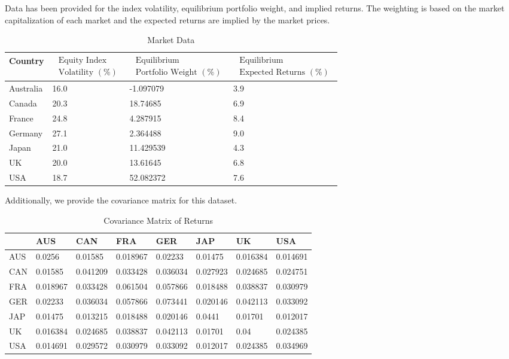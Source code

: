 \documentclass[13pt]{article}
\theoremstyle{definition}
\theoremstyle{remark}
\begin{document}
Data has been provided for the index volatility, equilibrium portfolio weight, and implied returns. The weighting is based on the market capitalization of each market and the expected returns are implied by the market prices. 

\begin{table}[!htp]
\centering
    \caption{Market Data}
    \label{tab:market data}
\begin{tabular}{|l|l|l|l|}
\hline Country & $\begin{array}{l}\text { Equity Index}\\ \text{ Volatility }
(\%)\end{array}$ & $\begin{array}{l}\text { Equilibrium}\\ \text{ Portfolio Weight }(\%)\end{array}$ & $\begin{array}{l}\text { Equilibrium} \\
\text { Expected  Returns }(\%)\end{array}$ \\
\hline Australia & 16.0 & -1.097079 & 3.9 \\
\hline Canada & 20.3 & 18.74685 & 6.9 \\
\hline France & 24.8 & 4.287915 & 8.4 \\
\hline Germany & 27.1 & 2.364488 & 9.0 \\
\hline Japan & 21.0 & 11.429539 & 4.3 \\
\hline UK & 20.0 & 13.61645 & 6.8 \\
\hline USA & 18.7 & 52.082372 & 7.6 \\
\hline
\end{tabular}
\end{table}
Additionally, we provide the covariance matrix for this dataset.
\begin{table}[!htp]
\centering
    \caption{Covariance Matrix of Returns}
    \label{tab:covariance matrix}
\begin{tabular}{|l|l|l|l|l|l|l|l|}
\hline & AUS & CAN & FRA & GER & JAP & UK & USA \\
\hline AUS & 0.0256 & 0.01585 & 0.018967 & 0.02233 & 0.01475 & 0.016384 & 0.014691 \\
\hline CAN & 0.01585 & 0.041209 & 0.033428 & 0.036034 & 0.027923 & 0.024685 & 0.024751 \\
\hline FRA & 0.018967 & 0.033428 & 0.061504 & 0.057866 & 0.018488 & 0.038837 & 0.030979 \\
\hline GER & 0.02233 & 0.036034 & 0.057866 & 0.073441 & 0.020146 & 0.042113 & 0.033092 \\
\hline JAP & 0.01475 & 0.013215 & 0.018488 & 0.020146 & 0.0441 & 0.01701 & 0.012017 \\
\hline UK & 0.016384 & 0.024685 & 0.038837 & 0.042113 & 0.01701 & 0.04 & 0.024385 \\
\hline USA & 0.014691 & 0.029572 & 0.030979 & 0.033092 & 0.012017 & 0.024385 & 0.034969 \\
\hline
\end{tabular}
\end{table}
\end{document}
